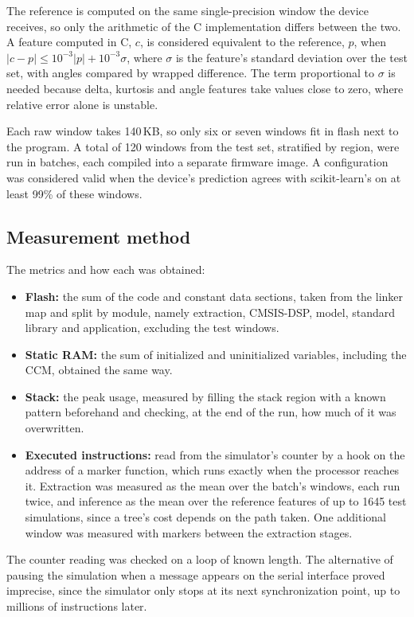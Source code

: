 \documentclass[11pt,a4paper]{article}
\begin{document}
The reference is computed on the same single-precision window the device receives, so only the arithmetic of the C implementation differs between the two. A feature computed in C, $c$, is considered equivalent to the reference, $p$, when $|c - p| \leq 10^{-3}|p| + 10^{-3}\sigma$, where $\sigma$ is the feature's standard deviation over the test set, with angles compared by wrapped difference. The term proportional to $\sigma$ is needed because delta, kurtosis and angle features take values close to zero, where relative error alone is unstable.

Each raw window takes 140\,KB, so only six or seven windows fit in flash next to the program. A total of 120 windows from the test set, stratified by region, were run in batches, each compiled into a separate firmware image. A configuration was considered valid when the device's prediction agrees with scikit-learn's on at least 99\% of these windows.

\subsection{Measurement method}
\label{sec:measurement}
The metrics and how each was obtained:
\begin{itemize}
    \item \textbf{Flash:} the sum of the code and constant data sections, taken from the linker map and split by module, namely extraction, CMSIS-DSP, model, standard library and application, excluding the test windows.
    \item \textbf{Static RAM:} the sum of initialized and uninitialized variables, including the CCM, obtained the same way.
    \item \textbf{Stack:} the peak usage, measured by filling the stack region with a known pattern beforehand and checking, at the end of the run, how much of it was overwritten.
    \item \textbf{Executed instructions:} read from the simulator's counter by a hook on the address of a marker function, which runs exactly when the processor reaches it. Extraction was measured as the mean over the batch's windows, each run twice, and inference as the mean over the reference features of up to 1645 test simulations, since a tree's cost depends on the path taken. One additional window was measured with markers between the extraction stages.
\end{itemize}

The counter reading was checked on a loop of known length. The alternative of pausing the simulation when a message appears on the serial interface proved imprecise, since the simulator only stops at its next synchronization point, up to millions of instructions later.
\end{document}
